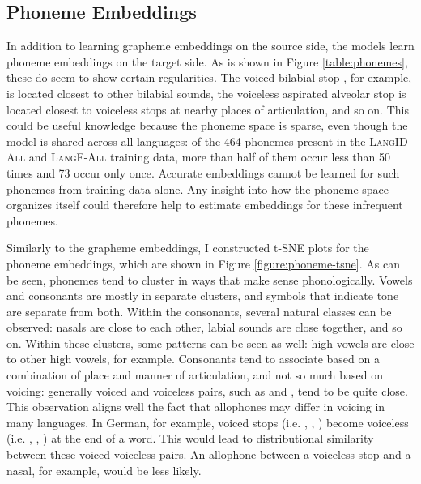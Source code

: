 

\subsection{Phoneme Embeddings}
In addition to learning grapheme embeddings on the source side, the models learn phoneme embeddings on the target side. As is shown in Figure \ref{table:phonemes}, these do seem to show certain regularities. The voiced bilabial stop , for example, is located closest to other bilabial sounds, the voiceless aspirated alveolar stop  is located closest to voiceless stops at nearby places of articulation, and so on. This could be useful knowledge because the phoneme space is sparse, even though the model is shared across all languages: of the 464 phonemes present in the \textsc{LangID-All} and \textsc{LangF-All} training data, more than half of them occur less than 50 times and 73 occur only once. Accurate embeddings cannot be learned for such phonemes from training data alone. Any insight into how the phoneme space organizes itself could therefore help to estimate embeddings for these infrequent phonemes.

Similarly to the grapheme embeddings, I constructed t-SNE plots for the phoneme embeddings, which are shown in Figure \ref{figure:phoneme-tsne}. As can be seen, phonemes tend to cluster in ways that make sense phonologically. Vowels and consonants are mostly in separate clusters, and symbols that indicate tone are separate from both. Within the consonants, several natural classes can be observed: nasals are close to each other, labial sounds are close together, and so on. Within these clusters, some patterns can be seen as well: high vowels are close to other high vowels, for example. Consonants tend to associate based on a combination of place and manner of articulation, and not so much based on voicing: generally voiced and voiceless pairs, such as  and , tend to be quite close. This observation aligns well the fact that allophones may differ in voicing in many languages. In German, for example, voiced stops (i.e. , , ) become voiceless (i.e. , , ) at the end of a word. This would lead to distributional similarity between these voiced-voiceless pairs. An allophone between a voiceless stop and a nasal, for example, would be less likely.

